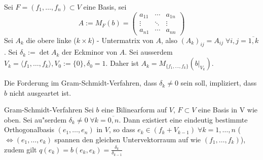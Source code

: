 \documentclass[oneside,fontsize=11pt,paper=a4,BCOR=0mm,DIV=12,automark,headsepline]{scrbook}
\newcommand{\gq}[1]{\glqq{}#1\grqq{}} %
\theoremstyle{remark}
\theoremstyle{definition}
\theoremstyle{definition}
\theoremstyle{remark}
\begin{document}
\begin{relation}
  Sei $F=(f_1, \dots, f_n)\subset V$ eine Basis, sei
  \[A:= M_F(b)=\begin{pmatrix}a_{11} & \cdots & a_{1n} \\ \vdots & \ddots & \vdots \\ a_{n1} & \cdots & a_{nn}\end{pmatrix}\] Sei $A_k$ die \gq{obere linke} ($k\times k$) -
  Untermatrix von \(A\), also \((A_k)_{ij} = A_{ij}\;\forall i,j=\overline{1,k}\).
  Sei $\delta_k:= \det A_k$ der Eckminor von $A$. Sei ausserdem $V_k=\langle
  f_1,\ldots, f_k \rangle, V_0:=\{0\}, \delta_0=1$. Daher ist \(A_k = M_{\{f_1,\dots, f_k\}}(b|_{V_k})\).
\end{relation}
\begin{comm}
  Die Forderung im Gram-Schmidt-Verfahren, dass \(\delta_k\neq 0\) sein soll, impliziert, dass \(b\) nicht ausgeartet ist.
\end{comm}
\begin{satz}{Gram-Schmidt-Verfahren}{}
  Sei $b$ eine Bilinearform auf $V$, $F\subset V$ eine Basis in V wie oben. Sei
  au"serdem $\delta_k \neq 0\;\forall k=\overline{0,n}$. Dann existiert eine eindeutig
  bestimmte Orthogonalbasis $(e_1,\ldots,e_n)$ in $V$, so dass \(e_k\in (f_k + V_{k-1})\;\forall k =1,\dots, n\) (\(\iff (e_1,\dots,e_k)\) spannen den gleichen Untervektorraum auf wie \((f_1,\dots,f_k)\)), zudem gilt \(q(e_k) = b(e_k, e_k) = \frac{\delta_k}{\delta_{k-1}}\)
\end{satz}
\end{document}
